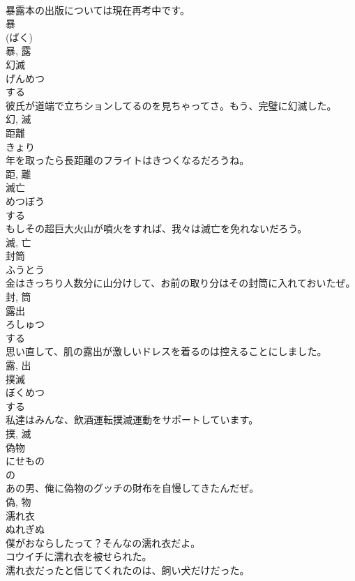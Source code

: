 \documentclass[8pt]{extreport}
\begin{document}
\begin{CJK}{UTF8}{min}
\\	暴露本の出版については現在再考中です。	
\\	暴 
\\	(ばく) 
\\	暴, 露	
\\	幻滅	
\\	げんめつ	
\\	する 
\\	彼氏が道端で立ちションしてるのを見ちゃってさ。もう、完璧に幻滅した。	
\\	幻, 滅	
\\	距離	
\\	きょり	
\\	年を取ったら長距離のフライトはきつくなるだろうね。	
\\	距, 離	
\\	滅亡	
\\	めつぼう	
\\	する 
\\	もしその超巨大火山が噴火をすれば、我々は滅亡を免れないだろう。	
\\	滅, 亡	
\\	封筒	
\\	ふうとう	
\\	金はきっちり人数分に山分けして、お前の取り分はその封筒に入れておいたぜ。	
\\	封, 筒	
\\	露出	
\\	ろしゅつ	
\\	する 
\\	思い直して、肌の露出が激しいドレスを着るのは控えることにしました。	
\\	露, 出	
\\	撲滅	
\\	ぼくめつ	
\\	する 
\\	私達はみんな、飲酒運転撲滅運動をサポートしています。	
\\	撲, 滅	
\\	偽物	
\\	にせもの	
\\	の 
\\	あの男、俺に偽物のグッチの財布を自慢してきたんだぜ。	
\\	偽, 物	
\\	濡れ衣	
\\	ぬれぎぬ	
\\	僕がおならしたって？そんなの濡れ衣だよ。	
\\	コウイチに濡れ衣を被せられた。	
\\	濡れ衣だったと信じてくれたのは、飼い犬だけだった。	

\end{CJK}
\end{document}
